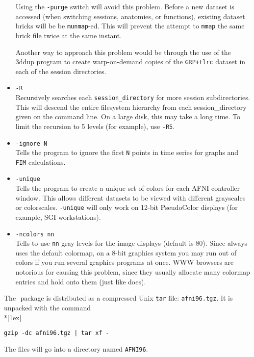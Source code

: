 \begin{itemize}
        Using the {\tt -purge} switch will avoid this problem.  Before a new
        dataset is accessed (when switching sessions, anatomies, or functions),
        existing dataset bricks will be be {\tt munmap}-ed.  This will prevent
        the attempt to {\tt mmap} the same brick file twice at the same instant.

        Another way to approach this problem would be through
        the use of the {\sf 3ddup} program to create warp-on-demand copies
        of the {\tt GRP+tlrc} dataset in each of the session directories.

   \item {\tt -R}\\
            Recursively searches each {\tt session\_directory} for more session
            subdirectories.
            This will descend the entire filesystem hierarchy from
            each session\_directory given on the command line.  On a
            large disk, this may take a long time.  To limit the
            recursion to 5 levels (for example), use {\tt -R5}.

   \item {\tt -ignore N} \\
         Tells the program to ignore the first {\tt N} points in
                  time series for graphs and {\tt FIM} calculations.

   \item {\tt -unique}\\
         Tells the program to create a unique set of colors
         for each AFNI controller window.  This allows
         different datasets to be viewed with different
         grayscales or colorscales.  {\tt -unique}
         will only work on 12-bit PseudoColor displays
         (for example, SGI workstations).

   \item {\tt -ncolors nn}\\
       Tells \afnit to use {\tt nn} gray levels for the image
       displays (default is 80).  Since \afnit always uses the
       default colormap, on a 8-bit graphics system you may
       run out of colors if you run several graphics programs
       at once.  WWW browsers are notorious for causing this problem,
       since they usually allocate many colormap entries and
       hold onto them (just like \afnit does).
\end{itemize}

The \MCW$\!$ \afnit package is distributed as a compressed Unix {\tt tar}
file: {\tt afni96.tgz}.
It is unpacked with the command\\*[1ex]
\centerline{\tt gzip -dc afni96.tgz | tar xf -}\vspace{1ex}
The files will go into a directory named {\tt AFNI96}.

